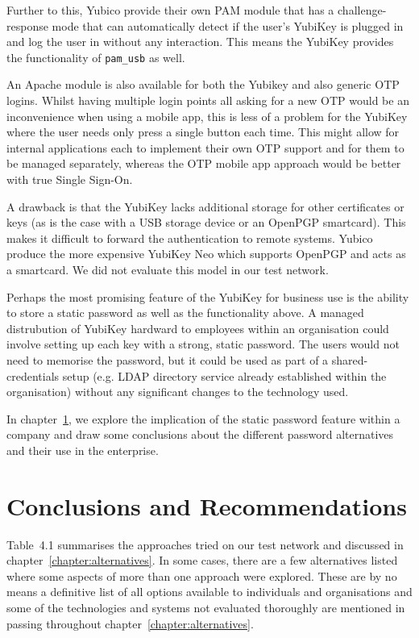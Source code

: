 \documentclass{report}
\begin{document}
Further to this, Yubico provide their own PAM module that has a challenge-response
mode that can automatically detect if the user's YubiKey is plugged in
and log the user in without any interaction. This means the YubiKey provides
the functionality of \texttt{pam\_usb} as well.

An Apache module is also available
for both the Yubikey and also generic OTP logins. Whilst having multiple
login points all asking for a new OTP would be an inconvenience when using a mobile
app, this is less of a problem for the YubiKey where the user needs only press
a single button each time. This might allow for internal applications each to
implement their own OTP support and for them to be managed separately, whereas
the OTP mobile app approach would be better with true Single Sign-On.

A drawback is that the YubiKey lacks additional storage for other certificates
or keys (as is the case with a USB storage device or an OpenPGP smartcard). This
makes it difficult to forward the authentication to remote systems. Yubico
produce the more expensive YubiKey Neo which supports OpenPGP and acts as
a smartcard. We did not evaluate this model in our test network.

Perhaps the most promising feature of the YubiKey for business use is the
ability to store a static password as well as the functionality above. A
managed distrubution of YubiKey hardward to employees within an organisation
could involve setting up each key with a strong, static password. The users
would not need to memorise the password, but it could be used as part of
a shared-credentials setup (e.g. LDAP directory service already established
within the organisation) without any significant changes to the technology
used.

In chapter~\ref{chapter:conclusion}, we explore the implication of the
static password feature within a company and draw some conclusions about the
different password alternatives and their use in the enterprise.

\chapter{Conclusions and Recommendations}
\label{chapter:conclusion}

Table~4.1 summarises the approaches tried on our test network
and discussed in chapter~\ref{chapter:alternatives}. In some cases, there
are a few alternatives listed where some aspects of more than one approach
were explored. These are by no means a definitive list of all options available
to individuals and organisations and some of the technologies and systems
not evaluated thoroughly are mentioned in passing throughout
chapter~\ref{chapter:alternatives}.
\end{document}
